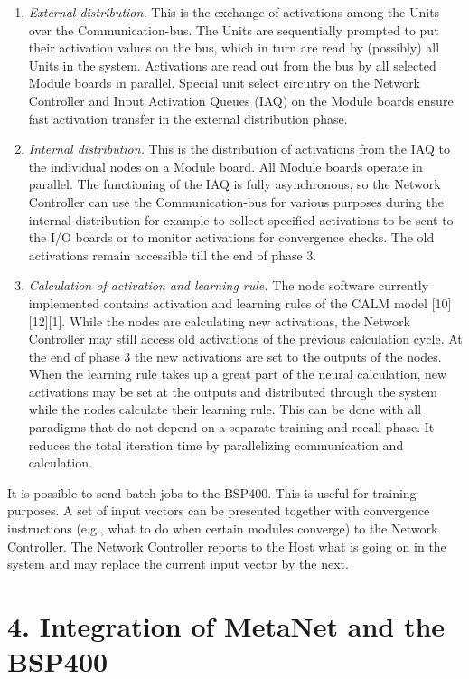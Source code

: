 \documentclass[11pt, a4paper]{article}
\begin{document}
\begin{enumerate}
  \item \textit{External distribution.} This is the exchange of activations among the Units over the Communication-bus. The Units are sequentially prompted to put their activation values on the bus, which in turn are read by (possibly) all Units in the system. Activations are read out from the bus by all selected Module boards in parallel. Special unit select circuitry on the Network Controller and Input Activation Queues (IAQ) on the Module boards ensure fast activation transfer in the external distribution phase.

  \item \textit{Internal distribution.} This is the distribution of activations from the IAQ to the individual nodes on a Module board. All Module boards operate in parallel. The functioning of the IAQ is fully asynchronous, so the Network Controller can use the Communication-bus for various purposes during the internal distribution for example to collect specified activations to be sent to the I/O boards or to monitor activations for convergence checks. The old activations remain accessible till the end of phase 3.

  \item \textit{Calculation of activation and learning rule.} The node software currently implemented contains activation and learning rules of the CALM model [10][12][1]. While the nodes are calculating new activations, the Network Controller may still access old activations of the previous calculation cycle. At the end of phase 3 the new activations are set to the outputs of the nodes. When the learning rule takes up a great part of the neural calculation, new activations may be set at the outputs and distributed through the system while the nodes calculate their learning rule. This can be done with all paradigms that do not depend on a separate training and recall phase. It reduces the total iteration time by parallelizing communication and calculation.
\end{enumerate}

It is possible to send batch jobs to the BSP400. This is useful for training purposes. A set of input vectors can be presented together with convergence instructions (e.g., what to do when certain modules converge) to the Network Controller. The Network Controller reports to the Host what is going on in the system and may replace the current input vector by the next.

\section*{\color{navyaccent} 4. Integration of MetaNet and the BSP400}
\end{document}
